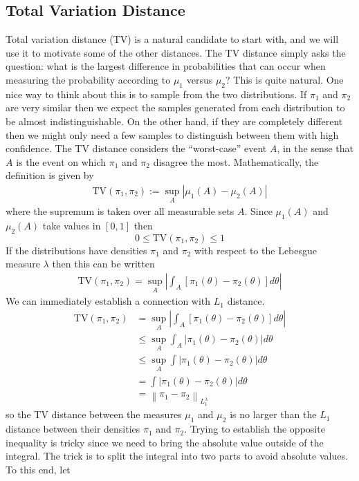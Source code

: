 \documentclass[12pt]{article}
\newcommand*{\norm}[1]{\left\lVert#1\right\rVert}
\newcommand*{\abs}[1]{\left\lvert#1\right\rvert}
\begin{document}
\subsection{Total Variation Distance}
Total variation distance (TV) is a natural candidate to start with, and we will use it to motivate some of the other distances. The TV distance simply asks the question: what is the largest difference in probabilities that can occur when measuring the probability according to $\mu_1$ versus $\mu_2$? This is quite natural. One nice way to think about this is to sample from the 
two distributions. If $\pi_1$ and $\pi_2$ are very similar then we expect the samples generated from each distribution to be almost indistinguishable. On the other hand, if they are completely 
different then we might only need a few samples to distinguish between them with high confidence. The TV distance considers the ``worst-case'' event $A$, in the sense that $A$ is the event 
on which $\pi_1$ and $\pi_2$ disagree the most. Mathematically, the definition is given by 
\begin{align*}
\text{TV}(\pi_1, \pi_2) := \sup_{A} \abs{\mu_1(A) - \mu_2(A)}
\end{align*}
where the supremum is taken over all measurable sets $A$. Since $\mu_1(A)$ and $\mu_2(A)$ take values in $[0, 1]$ then 
\[0 \leq \text{TV}(\pi_1, \pi_2) \leq 1\]
If the distributions have densities $\pi_1$ and $\pi_2$ with respect to the Lebesgue measure $\lambda$ then this can be 
written 
\begin{align*}
\text{TV}(\pi_1, \pi_2) = \sup_{A} \abs{\int_A \left[\pi_1(\theta) - \pi_2(\theta)\right] d\theta }
\end{align*}
We can immediately establish a connection with $L_1$ distance. 
\begin{align*}
\text{TV}(\pi_1, \pi_2) &= \sup_{A} \abs{\int_A \left[\pi_1(\theta) - \pi_2(\theta)\right] d\theta } \\
				 &\leq \sup_{A} \int_A \abs{\pi_1(\theta) - \pi_2(\theta)} d\theta \\
				 &\leq \sup_{A} \int \abs{\pi_1(\theta) - \pi_2(\theta)} d\theta \\
				 &= \int \abs{\pi_1(\theta) - \pi_2(\theta)} d\theta \\
				 &= \norm{\pi_1 - \pi_2}_{L_1^\lambda}
\end{align*}
so the TV distance between the measures $\mu_1$ and $\mu_2$ is no larger than the $L_1$ distance between their densities $\pi_1$ and $\pi_2$. Trying to establish the opposite 
inequality is tricky since we need to bring the absolute value outside of the integral. The trick is to split the integral into two parts to avoid absolute values. To this end, let 
\end{document}
